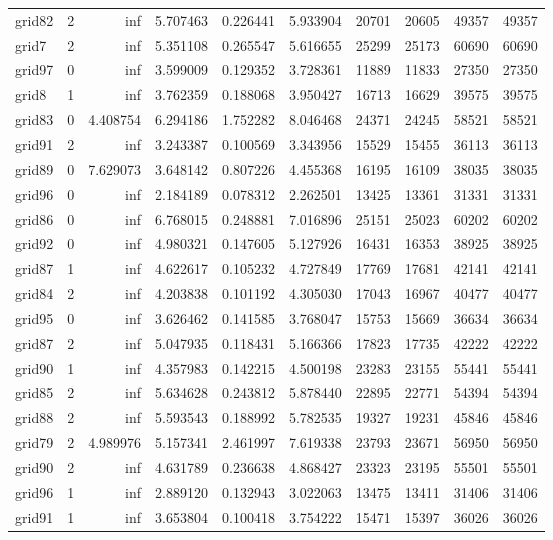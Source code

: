 \begin{longtable}{|l|r|r|r|r|r|r|r|r|r|}
grid82 & 2 & inf & 5.707463 & 0.226441 & 5.933904 & 20701 & 20605 & 49357 & 49357 \\
grid7 & 2 & inf & 5.351108 & 0.265547 & 5.616655 & 25299 & 25173 & 60690 & 60690 \\
grid97 & 0 & inf & 3.599009 & 0.129352 & 3.728361 & 11889 & 11833 & 27350 & 27350 \\
grid8 & 1 & inf & 3.762359 & 0.188068 & 3.950427 & 16713 & 16629 & 39575 & 39575 \\
grid83 & 0 & 4.408754 & 6.294186 & 1.752282 & 8.046468 & 24371 & 24245 & 58521 & 58521 \\
grid91 & 2 & inf & 3.243387 & 0.100569 & 3.343956 & 15529 & 15455 & 36113 & 36113 \\
grid89 & 0 & 7.629073 & 3.648142 & 0.807226 & 4.455368 & 16195 & 16109 & 38035 & 38035 \\
grid96 & 0 & inf & 2.184189 & 0.078312 & 2.262501 & 13425 & 13361 & 31331 & 31331 \\
grid86 & 0 & inf & 6.768015 & 0.248881 & 7.016896 & 25151 & 25023 & 60202 & 60202 \\
grid92 & 0 & inf & 4.980321 & 0.147605 & 5.127926 & 16431 & 16353 & 38925 & 38925 \\
grid87 & 1 & inf & 4.622617 & 0.105232 & 4.727849 & 17769 & 17681 & 42141 & 42141 \\
grid84 & 2 & inf & 4.203838 & 0.101192 & 4.305030 & 17043 & 16967 & 40477 & 40477 \\
grid95 & 0 & inf & 3.626462 & 0.141585 & 3.768047 & 15753 & 15669 & 36634 & 36634 \\
grid87 & 2 & inf & 5.047935 & 0.118431 & 5.166366 & 17823 & 17735 & 42222 & 42222 \\
grid90 & 1 & inf & 4.357983 & 0.142215 & 4.500198 & 23283 & 23155 & 55441 & 55441 \\
grid85 & 2 & inf & 5.634628 & 0.243812 & 5.878440 & 22895 & 22771 & 54394 & 54394 \\
grid88 & 2 & inf & 5.593543 & 0.188992 & 5.782535 & 19327 & 19231 & 45846 & 45846 \\
grid79 & 2 & 4.989976 & 5.157341 & 2.461997 & 7.619338 & 23793 & 23671 & 56950 & 56950 \\
grid90 & 2 & inf & 4.631789 & 0.236638 & 4.868427 & 23323 & 23195 & 55501 & 55501 \\
grid96 & 1 & inf & 2.889120 & 0.132943 & 3.022063 & 13475 & 13411 & 31406 & 31406 \\
grid91 & 1 & inf & 3.653804 & 0.100418 & 3.754222 & 15471 & 15397 & 36026 & 36026 \\

\end{longtable}
